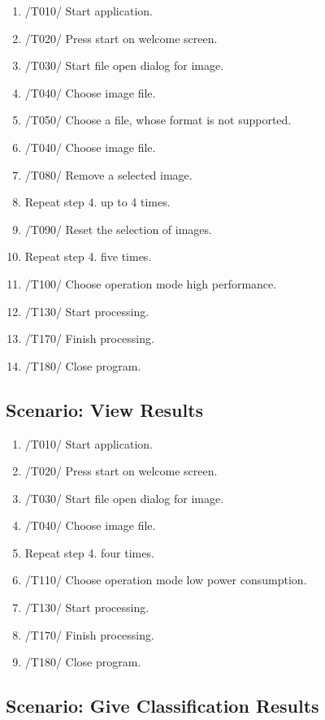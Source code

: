 \documentclass[parskip=full]{scrartcl}
\begin{document}
\begin{enumerate}
	\item /T010/ Start application. 
	\item /T020/ Press start on welcome screen.
	\item /T030/ Start file open dialog for image.
	\item /T040/ Choose image file.
	\item /T050/ Choose a file, whose format is not supported.
	\item /T040/ Choose image file.
	\item /T080/ Remove a selected image.
	\item Repeat step 4. up to 4 times.
	\item /T090/ Reset the selection of images. 
	\item Repeat step 4. five times.
	\item /T100/ Choose operation mode high performance.
	\item /T130/ Start processing.
	\item /T170/ Finish processing.
	\item /T180/ Close program.
\end{enumerate}

\pagebreak



\subsection {Scenario: View Results}

\begin{enumerate}
	\item /T010/ Start application.  
	\item /T020/ Press start on welcome screen.
	\item /T030/ Start file open dialog for image.
	\item /T040/ Choose image file.
	\item Repeat step 4. four times.
	\item /T110/ Choose operation mode low power consumption.
	\item /T130/ Start processing.
	\item /T170/ Finish processing.
	\item /T180/ Close program.
\end{enumerate}

\pagebreak

\subsection {Scenario: Give Classification Results}
\end{document}
